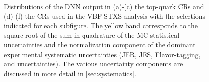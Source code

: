 \begin{figure}[h!]
{        }  \\
        \caption{
            Distributions of the DNN output in (a)-(c) the top-quark CRs and (d)-(f) the \Ztautau CRs used in the VBF STXS analysis with the selections indicated for each subfigure. The yellow band corresponds to the square root of the sum in quadrature of the MC statistical uncertainties and the normalization component of the dominant experimental systematic uncertainties (JER, JES, Flavor-tagging, and \MET uncertainties). The various uncertainty components are discussed in more detail in \cref{sec:systematics}.}
        \label{fig:dnn-output-vbf-stxs}
    \end{figure}

